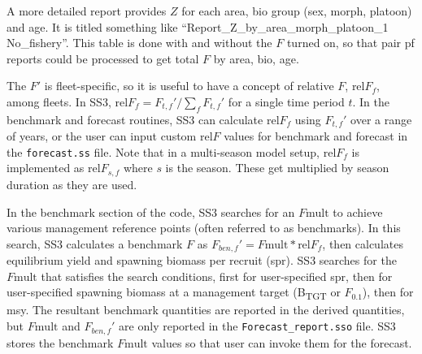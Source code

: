 A more detailed report provides $Z$ for each area, bio group (sex, morph, platoon) and age. It is titled something like ``Report\_Z\_by\_area\_morph\_platoon\_1 No\_fishery''. This table is done with and without the $F$ turned on, so that pair pf reports could be processed to get total $F$ by area, bio, age.

The $F'$ is fleet-specific, so it is useful to have a concept of relative $F$, $\text{rel}F_f$, among fleets. In SS3, $\text{rel}F_f= F_{t,f}'/\sum_{f}^{}F_{t,f}'$ for a single time period $t$. In the benchmark and forecast routines, SS3 can calculate $\text{rel}F_f$ using $F_{t,f}'$ over a range of years, or the user can input custom $\text{rel}F$ values for benchmark and forecast in the \texttt{forecast.ss} file. Note that in a multi-season model setup, $\text{rel}F_f$ is implemented as $\text{rel}F_{s,f}$ where $s$ is the season. These get multiplied by season duration as they are used.

In the benchmark section of the code, SS3 searches for an $F\text{mult}$ to achieve various management reference points (often referred to as benchmarks). In this search, SS3 calculates a benchmark $F$ as $F_{ben,f}' = F\text{mult} * \text{rel}F_f$, then calculates equilibrium yield and spawning biomass per recruit (\gls{spr}). SS3 searches for the $F\text{mult}$ that satisfies the search conditions, first for user-specified \gls{spr}, then for user-specified spawning biomass at a management target (B\textsubscript{TGT} or $F_{0.1}$), then for \gls{msy}. The resultant benchmark quantities are reported in the derived quantities, but $F\text{mult}$ and $F_{ben,f}'$ are only reported in the \texttt{Forecast\_report.sso} file. SS3 stores the benchmark $F\text{mult}$ values so that user can invoke them for the forecast.

